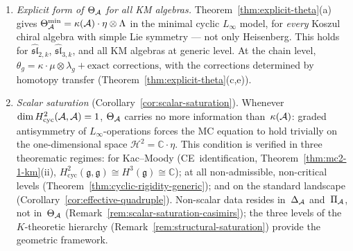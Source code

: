\begin{enumerate}[label=\textup{(\roman*)}]
\item \emph{Explicit form of $\Theta_{\mathcal{A}}$ for all KM algebras.}
  Theorem~\ref{thm:explicit-theta}(a) gives
  $\Theta_{\mathcal{A}}^{\min} = \kappa(\mathcal{A}) \cdot \eta \otimes \Lambda$
  in the minimal cyclic $L_\infty$ model, for \emph{every} Koszul
  chiral algebra with simple Lie symmetry --- not only Heisenberg.
  This holds for $\widehat{\mathfrak{sl}}_{2,k}$,
  $\widehat{\mathfrak{sl}}_{3,k}$, and all KM algebras at generic
  level.  At the chain level, $\theta_g = \kappa \cdot \mu \otimes
  \lambda_g + \text{exact corrections}$, with the corrections
  determined by homotopy transfer
  (Theorem~\ref{thm:explicit-theta}(c,e)).
\item \emph{Scalar saturation}
  (Corollary~\ref{cor:scalar-saturation}).
  Whenever $\dim H^2_{\mathrm{cyc}}(\mathcal{A},\mathcal{A}) = 1$,
  $\Theta_{\mathcal{A}}$ carries no more information than~$\kappa(\mathcal{A})$:
  graded antisymmetry of $L_\infty$-operations forces the MC
  equation to hold trivially on the one-dimensional space
  $\mathcal{H}^2 = \mathbb{C}\!\cdot\!\eta$.
  This condition is verified in three theorematic regimes: for Kac--Moody
  (CE~identification, Theorem~\ref{thm:mc2-1-km}(ii),
  $H^2_{\mathrm{cyc}}(\mathfrak{g},\mathfrak{g}) \cong
  H^3(\mathfrak{g}) \cong \mathbb{C}$);
  at all non-admissible, non-critical levels
  (Theorem~\ref{thm:cyclic-rigidity-generic});
  and on the standard landscape
  (Corollary~\ref{cor:effective-quadruple}).
  Non-scalar data resides in~$\Delta_{\mathcal{A}}$
  and~$\Pi_{\mathcal{A}}$, not in~$\Theta_{\mathcal{A}}$
  (Remark~\ref{rem:scalar-saturation-casimirs}); the three
  levels of the $K$-theoretic hierarchy
  (Remark~\ref{rem:structural-saturation}) provide the
  geometric framework.
\end{enumerate}

